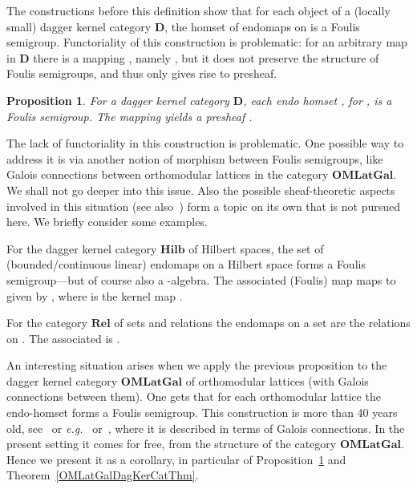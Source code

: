 \documentclass{article}
\newif\ifignore \ignorefalse
\newcommand{\auxproof}[1]{
\ifignore\mbox{}\newline
\textbf{PROOF:} \dotfill\newline
{\it #1}\mbox{}\newline
\textbf{ENDPROOF}\dotfill
\fi}
\newtheorem{proposition}[theorem]{Proposition}
\newcommand{\QED}{\hspace*{\fill}}
\newcommand{\Cat}[1]{\ensuremath{\mathbf{#1}}}
\newcommand{\Rel}{\Cat{Rel}\xspace}
\newcommand{\Hilb}{\Cat{Hilb}\xspace}
\begin{document}
\auxproof{
We show the equivalence of  and .

Assume . Since  we have  for
some . Hence . 

Next, , so that 
and thus .

Finally, in order to prove  we first note:


\noindent Hence ,
for some , and thus:


Conversely, assume . If , then 


\noindent And if , then .
}



The constructions before this definition show that for each object
 of a (locally small) dagger kernel category \Cat{D}, the
homset  of endomaps on  is a Foulis
semigroup. Functoriality of this construction is problematic: for an
arbitrary map  in \Cat{D} there is a mapping
, namely , but it does not preserve the structure of Foulis semigroups,
and thus only gives rise to presheaf.


\begin{proposition}
\label{DagKer2FoulisProp}
For a dagger kernel category \Cat{D}, each endo homset ,
for , is a Foulis semigroup. The mapping  yields a presheaf . \QED
\end{proposition}




The lack of functoriality in this construction is problematic. One
possible way to address it is via another notion of morphism between
Foulis semigroups, like Galois connections between orthomodular
lattices in the category \Cat{OMLatGal}. We shall not go deeper into
this issue. Also the possible sheaf-theoretic aspects involved in this
situation (see also~\cite{GravesS73}) form a topic on its own that is
not pursued here.  We briefly consider some examples.

For the dagger kernel category \Hilb of Hilbert spaces, the set  of (bounded/continuous linear) endomaps on a Hilbert space
 forms a Foulis semigroup---but of course also a -algebra. The
associated (Foulis) map  maps  to  given by , where  is the kernel map
.



For the category \Rel of sets and relations the endomaps on a set 
are the relations  on . The associated
 is .

An interesting situation arises when we apply the previous proposition
to the dagger kernel category \Cat{OMLatGal} of orthomodular lattices
(with Galois connections between them). One gets that for each
orthomodular lattice  the endo-homset  forms a Foulis semigroup. This construction is
more than 40 years old, see~\cite{Foulis60} or
\textit{e.g.}~\cite[Chapter~II, Section~19]{BlythJ72}
or~\cite[Chapter~5, \S\S18]{Kalmbach83}, where it is described in
terms of Galois connections.  In the present setting it comes for
free, from the structure of the category \Cat{OMLatGal}. Hence we
present it as a corollary, in particular of
Proposition~\ref{DagKer2FoulisProp} and
Theorem~\ref{OMLatGalDagKerCatThm}.
\end{document}
